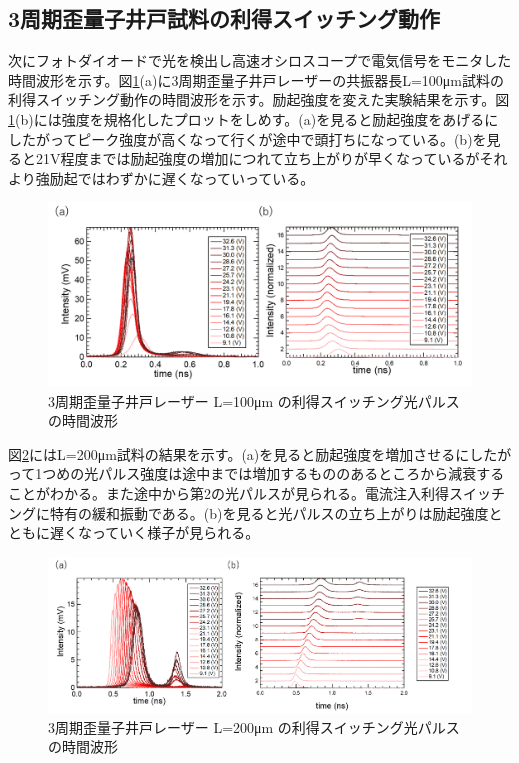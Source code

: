 {\subsection{3周期歪量子井戸試料の利得スイッチング動作}%
次にフォトダイオードで光を検出し高速オシロスコープで電気信号をモニタした時間波形を示す。図\ref{fig:fig_3_2_3QW_ridge_L100_GS}(a)に3周期歪量子井戸レーザーの共振器長L=100\si{\micro\metre}試料の利得スイッチング動作の時間波形を示す。励起強度を変えた実験結果を示す。図\ref{fig:fig_3_2_3QW_ridge_L100_GS}(b)には強度を規格化したプロットをしめす。(a)を見ると励起強度をあげるにしたがってピーク強度が高くなって行くが途中で頭打ちになっている。(b)を見ると21V程度までは励起強度の増加につれて立ち上がりが早くなっているがそれより強励起ではわずかに遅くなっていっている。
\begin{figure}[h]
	\centering
	\includegraphics[width=15cm]{figure/fig_3_2_3QW_ridge_L100_GS.png}
		\caption{3周期歪量子井戸レーザー L=100\si{\micro\metre} の利得スイッチング光パルスの時間波形}
		\label{fig:fig_3_2_3QW_ridge_L100_GS}
\end{figure}


図\ref{fig:fig_3_2_3QW_ridge_L200_GS}にはL=200\si{\micro\metre}試料の結果を示す。(a)を見ると励起強度を増加させるにしたがって1つめの光パルス強度は途中までは増加するもののあるところから減衰することがわかる。また途中から第2の光パルスが見られる。電流注入利得スイッチングに特有の緩和振動である。(b)を見ると光パルスの立ち上がりは励起強度とともに遅くなっていく様子が見られる。


\begin{figure}[h]
	\centering
	\includegraphics[width=15cm]{figure/fig_3_2_3QW_ridge_L200_GS.png}
		\caption{3周期歪量子井戸レーザー L=200\si{\micro\metre} の利得スイッチング光パルスの時間波形}
		\label{fig:fig_3_2_3QW_ridge_L200_GS}
\end{figure}



}
